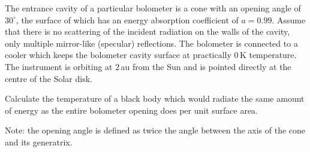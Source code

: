 The entrance cavity of a particular bolometer is a cone with an opening angle
of $30^\circ$, the surface of which has an energy absorption coefficient of
$a = 0.99$. Assume that there is no scattering of the incident radiation on
the walls of the cavity, only multiple mirror-like (specular) reflections.
The bolometer is connected to a cooler which keeps the bolometer cavity
surface at practically 0\,K temperature. The instrument is orbiting at 2\,au
from the Sun and is pointed directly at the centre of the Solar disk.

Calculate the temperature of a black body which would radiate the same
amount of energy as the entire bolometer opening does per unit surface area.

Note: the opening angle is defined as twice the angle between the axis of
the cone and its generatrix.
